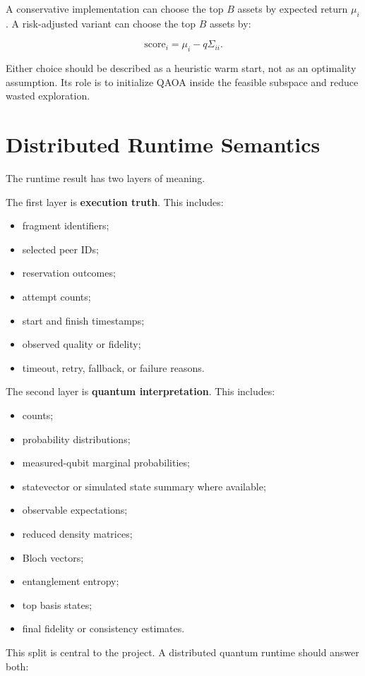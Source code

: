 \documentclass[11pt]{article}
\begin{document}
A conservative implementation can choose the top \(B\) assets by expected return \(\mu_i\). A risk-adjusted variant can choose the top \(B\) assets by:

\[
\mathrm{score}_i=\mu_i-q\Sigma_{ii}.
\]

Either choice should be described as a heuristic warm start, not as an optimality assumption. Its role is to initialize QAOA inside the feasible subspace and reduce wasted exploration.

\section{Distributed Runtime Semantics}

The runtime result has two layers of meaning.

The first layer is \textbf{execution truth}. This includes:

\begin{itemize}
\item fragment identifiers;
\item selected peer IDs;
\item reservation outcomes;
\item attempt counts;
\item start and finish timestamps;
\item observed quality or fidelity;
\item timeout, retry, fallback, or failure reasons.
\end{itemize}

The second layer is \textbf{quantum interpretation}. This includes:

\begin{itemize}
\item counts;
\item probability distributions;
\item measured-qubit marginal probabilities;
\item statevector or simulated state summary where available;
\item observable expectations;
\item reduced density matrices;
\item Bloch vectors;
\item entanglement entropy;
\item top basis states;
\item final fidelity or consistency estimates.
\end{itemize}

This split is central to the project. A distributed quantum runtime should answer both:
\end{document}
